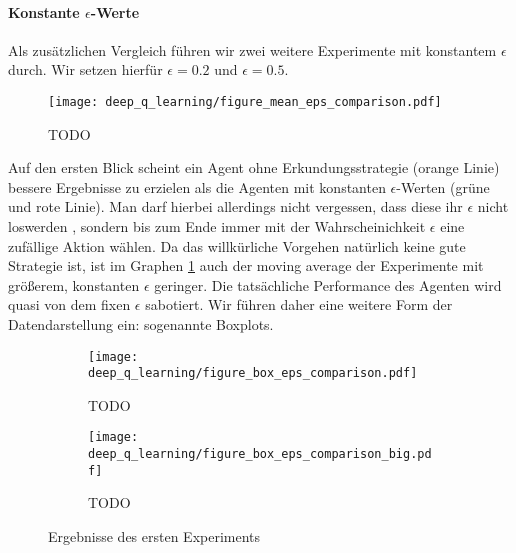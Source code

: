 \paragraph{Konstante $ \epsilon $-Werte}
Als zusätzlichen Vergleich führen wir zwei weitere Experimente mit konstantem $ \epsilon $ durch. Wir setzen hierfür $ \epsilon = 0.2 $ und $ \epsilon = 0.5 $.
\begin{figure}[H]
    \centering
    \texttt{[image: deep\_q\_learning/figure\_mean\_eps\_comparison.pdf]}
    \caption{TODO} \label{img:graphEpsComparison}
\end{figure}
Auf den ersten Blick scheint ein Agent ohne Erkundungsstrategie (orange Linie) bessere Ergebnisse zu erzielen als die Agenten mit konstanten $ \epsilon $-Werten (grüne und rote Linie). Man darf hierbei allerdings nicht vergessen, dass diese ihr $ \epsilon $ nicht \glqq loswerden \grqq{}, sondern bis zum Ende immer mit der Wahrscheinichkeit $ \epsilon $ eine zufällige Aktion wählen. Da das willkürliche Vorgehen natürlich keine gute Strategie ist, ist im Graphen \ref{img:graphEpsComparison} auch der moving average der Experimente mit größerem, konstanten $ \epsilon $ geringer. Die tatsächliche Performance des Agenten wird quasi von dem fixen $ \epsilon $ sabotiert. Wir führen daher eine weitere Form der Datendarstellung ein: sogenannte Boxplots.
\begin{figure}[h!]
    \centering
    \begin{subfigure}[b]{0.7\textwidth}
        \texttt{[image: deep\_q\_learning/figure\_box\_eps\_comparison.pdf]}
        \caption{TODO}
        \label{img:graphBoxEpsComparison}
    \end{subfigure}
    \begin{subfigure}[b]{0.7\textwidth}
        \texttt{[image: deep\_q\_learning/figure\_box\_eps\_comparison\_big.pdf]}
        \caption{TODO}
        \label{img:graphBoxEpsComparisonBig}
    \end{subfigure}
    \caption{Ergebnisse des ersten Experiments}
\end{figure} \label{img:graphBoxEpsComparisonBoth}

